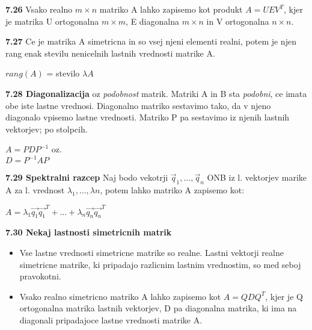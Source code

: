 \documentclass{article}
\begin{document}
\begin{multicols}{4}
\textbf{7.26} Vsako realno $m \times n$ matriko A lahko zapisemo kot produkt
$A = UEV^{T}$, kjer je matrika U ortogonalna $m \times m$, E diagonalna $m \times n$ in
V ortogonalna $n \times n$.

\textbf{7.27} Ce je  matrika A simetricna in so vsej njeni elementi realni, potem je njen rang enak stevilu nenicelnih lastnih
vrednosti matrike A.
\begin{center}
    $rang(A)$ = stevilo $\lambda A$
\end{center}

\textbf{7.28 Diagonalizacija} oz \textit{podobnost} matrik. Matriki A in B sta \textit{podobni}, ce imata
obe iste lastne vrednosi. Diagonalno matriko sestavimo tako, da v njeno diagonalo vpisemo lastne vrednosti. Matriko 
P pa sestavimo iz njenih lastnih vektorjev; po stolpcih.
\begin{center}
    \begin{math}
        A = PDP^{-1}
    \end{math} oz.\\
    \begin{math}
        D = P^{-1}AP
    \end{math}
\end{center}

\textbf{7.29 Spektralni razcep}
Naj bodo vekotrji $\vec{q}_{1}, \dots, \vec{q}_{n}$ ONB iz l. vektorjev marike A za l. vrednost $\lambda_{1}, \dots, \lambda{n}$,
potem lahko matriko A zapisemo kot:
\begin{center}
    \begin{math}
        A = \lambda_{1} \vec{q_{1}} \vec{q_{1}}^{T} + \dots + \lambda_{n} \vec{q_{n}} \vec{q_{n}}^{T}
    \end{math}
\end{center}

\textbf{7.30 Nekaj lastnosti simetricnih matrik}
\begin{itemize}
    \item Vse lastne vrednosti simetricne matrike so realne. Lastni vektorji realne simetricne matrike, ki 
    pripadajo razlicnim lastnim vrednostim, so med seboj pravokotni.
    \item Vsako realno simetricno matriko A lahko zapisemo kot $A = QDQ^{T}$, kjer je Q ortogonalna matrika lastnih vektorjev, D pa diagonalna matrika,
    ki ima na diagonali pripadajoce lastne vrednosti matrike A.
\end{itemize}

\end{multicols}
\end{document}
